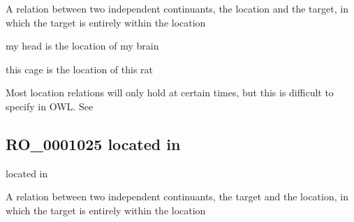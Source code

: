 \documentclass[letterpaper,10pt,english]{sphinxmanual}
\begin{document}
\begin{sphinxShadowBox}

\sphinxAtStartPar
A relation between two independent continuants, the location and the target, in which the target is entirely within the location
\end{sphinxShadowBox}

\begin{sphinxShadowBox}

\sphinxAtStartPar
my head is the location of my brain

\sphinxAtStartPar
this cage is the location of this rat
\end{sphinxShadowBox}

\begin{sphinxShadowBox}

\sphinxAtStartPar
Most location relations will only hold at certain times, but this is difficult to specify in OWL. See 
\end{sphinxShadowBox}

\begin{sphinxShadowBox}

\sphinxAtStartPar
{}
\end{sphinxShadowBox}
\begin{quote}

\ignorespaces \end{quote}


\subsection{RO\_0001025 \sphinxhyphen{} located in}
\label{\detokenize{doc-RO_0001025:ro-0001025-located-in}}\label{\detokenize{doc-RO_0001025:index-0}}\label{\detokenize{doc-RO_0001025::doc}}
\begin{sphinxShadowBox}

\sphinxAtStartPar
located in
\end{sphinxShadowBox}

\begin{sphinxShadowBox}

\sphinxAtStartPar
A relation between two independent continuants, the target and the location, in which the target is entirely within the location
\end{sphinxShadowBox}
\end{document}
